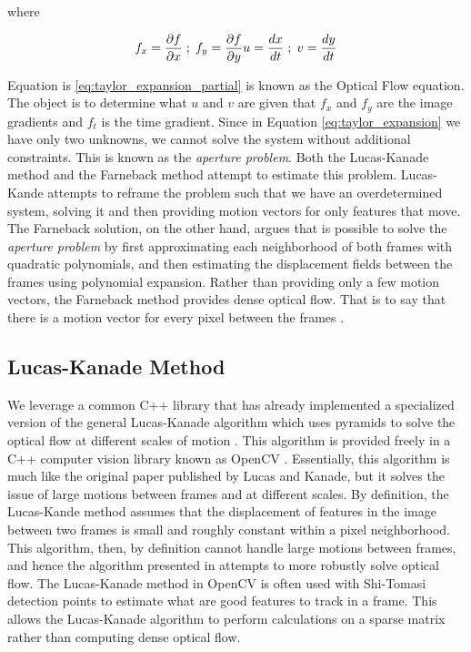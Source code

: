 where

\begin{equation}
f_x = \frac{\partial f}{\partial x} \; ; \; f_y = \frac{\partial f}{\partial y} \\
u = \frac{dx}{dt} \; ; \; v = \frac{dy}{dt}
\label{eq:taylor_expansion_partial}
\end{equation}

 Equation is \ref{eq:taylor_expansion_partial} is known as the Optical Flow
 equation. The object is to determine what $u$ and $v$ are given that $f_x$ and
 $f_y$ are the image gradients and $f_t$ is the time gradient. Since in Equation
 \ref{eq:taylor_expansion} we have only two unknowns, we cannot solve the system
 without additional constraints. This is known as the \textit{aperture problem}.
 Both the Lucas-Kanade method and the Farneback method attempt to estimate this
 problem. Lucas-Kande attempts to reframe the problem such that we have an
 overdetermined system, solving it and then providing motion vectors for only
 features that move. The Farneback solution, on the other hand, argues that is
 possible to solve the \textit{aperture problem} by first approximating each
 neighborhood of both frames with quadratic polynomials, and then estimating the
 displacement fields between the frames using polynomial expansion. Rather than
 providing only a few motion vectors, the Farneback method provides dense
 optical flow. That is to say that there is a motion vector for every pixel
 between the frames \cite{farneback2003two}.

\subsection{\label{subsection:lucas_kanade} Lucas-Kanade Method}
We leverage a common C++ library that has already implemented a specialized
version of the general Lucas-Kanade algorithm which uses pyramids to solve the
optical flow at different scales of motion \cite{bouguet2001pyramidal}. This
algorithm is provided freely in a C++ computer vision library known as OpenCV
\cite{itseez2015opencv}. Essentially, this algorithm is much like the original
paper published by Lucas and Kanade, but it solves the issue of large motions
between frames and at different scales. By definition, the Lucas-Kande method
assumes that the displacement of features in the image between two frames is
small and roughly constant within a pixel neighborhood. This algorithm, then, by
definition cannot handle large motions between frames, and hence the algorithm
presented in \cite{bouguet2001pyramidal} attempts to more robustly solve optical
flow. The Lucas-Kanade method in OpenCV is often used with Shi-Tomasi
\cite{shi1994good} detection points to estimate what are good features to track
in a frame. This allows the Lucas-Kanade algorithm to perform calculations on a
sparse matrix rather than computing dense optical flow.

